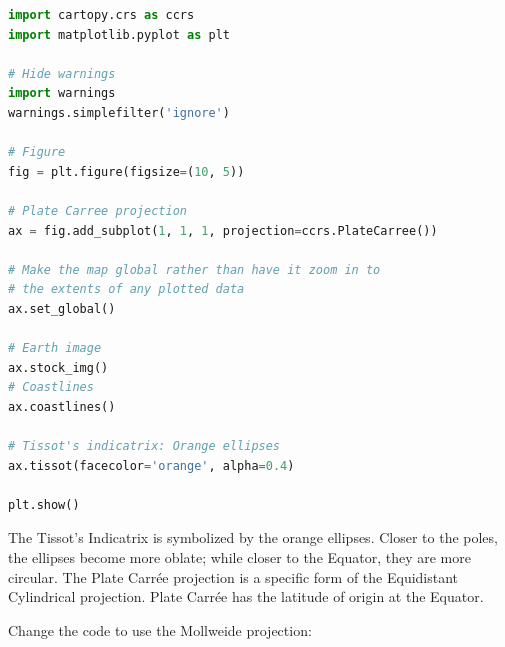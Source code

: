\documentclass[a4paper , 12pt]{book}
\begin{document}
\begin{center}
\begin{lstlisting}[language=Python, frame=single]
import cartopy.crs as ccrs
import matplotlib.pyplot as plt

# Hide warnings
import warnings
warnings.simplefilter('ignore')

# Figure
fig = plt.figure(figsize=(10, 5))

# Plate Carree projection
ax = fig.add_subplot(1, 1, 1, projection=ccrs.PlateCarree())

# Make the map global rather than have it zoom in to
# the extents of any plotted data
ax.set_global()

# Earth image
ax.stock_img()
# Coastlines
ax.coastlines()

# Tissot's indicatrix: Orange ellipses
ax.tissot(facecolor='orange', alpha=0.4)

plt.show()
\end{lstlisting}
\end{center}

The Tissot’s Indicatrix is symbolized by the orange ellipses. Closer to the poles, the ellipses become more oblate; while closer to the Equator, they are more circular. The Plate Carrée projection is a specific form of the Equidistant Cylindrical projection. Plate Carrée has the latitude of origin at the Equator.

Change the code to use the Mollweide projection:
\end{document}
